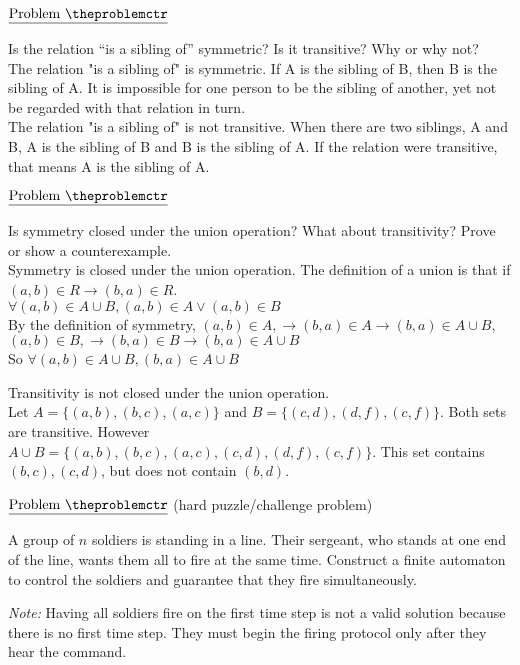 \documentclass[11pt]{article}
\def\pp{\par\noindent}
\begin{document}
\addtocounter{problemctr}{1}
\bigskip
\noindent
$\underline{\rm Problem\ \theproblemctr}$ \pp
Is the relation ``is a sibling of'' symmetric? Is it transitive? Why or why not?\\

The relation "is a sibling of" is symmetric. If A is the sibling of B, then B is the sibling of A. It is impossible for one person to be the sibling of another, yet not be regarded with that relation in turn.\\

The relation "is a sibling of" is not transitive. When there are two siblings, A and B, A is the sibling of B and B is the sibling of A. If the relation were transitive, that means A is the sibling of A.\\


\addtocounter{problemctr}{1}
\bigskip
\noindent
$\underline{\rm Problem\ \theproblemctr}$ \pp
Is symmetry closed under the union operation? What about transitivity? Prove or show a counterexample.\\

Symmetry is closed under the union operation. The definition of a union is that if $(a,b)\in R\rightarrow(b,a)\in R$.\\
$\forall (a,b) \in A\cup B, (a,b)\in A \lor (a,b)\in B$\\
By the definition of symmetry, $(a,b)\in A, \rightarrow(b,a)\in A \rightarrow (b,a)\in A\cup B$, $(a,b)\in B, \rightarrow(b,a)\in B \rightarrow (b,a)\in A\cup B$\\
So $\forall (a,b) \in A\cup B, (b,a) \in A\cup B$


Transitivity is not closed under the union operation.\\
Let $A=\{(a,b),(b,c),(a,c)\}$ and $B=\{(c,d),(d,f),(c,f)\}$. Both sets are transitive. However $A\cup B=\{(a,b),(b,c),(a,c),(c,d),(d,f),(c,f)\}$. This set contains $(b,c),(c,d)$, but does not contain $(b,d)$.

\addtocounter{problemctr}{1}
\bigskip
\noindent
$\underline{\rm Problem\ \theproblemctr}$ (hard puzzle/challenge problem)\pp

\noindent
A group of $n$ soldiers is standing in a line. Their sergeant, who stands at one end of the line, wants them all to fire at the same time. Construct a finite automaton to control the soldiers and guarantee that they fire simultaneously.

\emph{Note:} Having all soldiers fire on the first time step is not a valid solution because there is no first time step. They must begin the firing protocol only after they hear the command.
\end{document}

